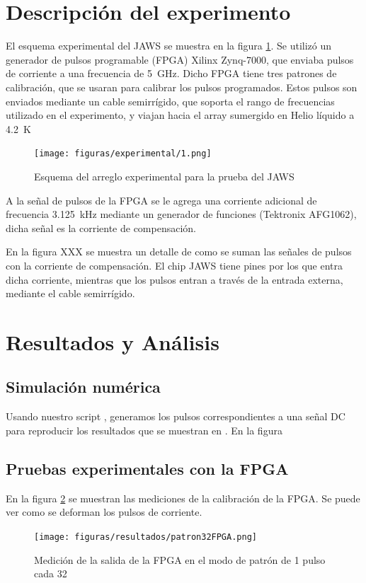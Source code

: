 \documentclass[twoside]{article}
\begin{document}
\begin{multicols}{2}
\section{Descripción del experimento}

El esquema experimental del JAWS se muestra en la figura \ref{fig:experimental_1}. Se utilizó un generador de pulsos programable (FPGA) Xilinx Zynq-7000, que enviaba pulsos de corriente a una frecuencia de \SI{5}{\giga\hertz}. Dicho FPGA tiene tres patrones de calibración, que se usaran para calibrar los pulsos programados. Estos pulsos son enviados mediante un cable semirrígido, que soporta el rango de frecuencias utilizado en el experimento, y viajan hacia el array sumergido en Helio líquido a \SI{4.2}{\kelvin}

\begin{figure}[H]
    \centering
    \texttt{[image: figuras/experimental/1.png]}
    \caption{Esquema del arreglo experimental para la prueba del JAWS}
    \label{fig:experimental_1}
\end{figure}

A la señal de pulsos de la FPGA se le agrega una corriente adicional de frecuencia \SI{3.125}{\kilo\hertz} mediante un generador de funciones (Tektronix AFG1062), dicha señal es la corriente de compensación.

En la figura XXX se muestra un detalle de como se suman las señales de pulsos con la corriente de compensación. El chip JAWS tiene pines por los que entra dicha corriente, mientras que los pulsos entran a través de la entrada externa, mediante el cable semirrígido.

\section{Resultados y Análisis}

    \subsection{Simulación numérica}

    Usando nuestro script \cite{script}, generamos los pulsos correspondientes a una señal DC para reproducir los resultados que se muestran en \cite{aziz1996}. En la figura 

    \subsection{Pruebas experimentales con la FPGA}

    En la figura \ref{fig:resultados_patron32FPGA} se muestran las mediciones de la calibración de la FPGA. Se puede ver como se deforman los pulsos de corriente.

    \begin{figure}[H]
        \centering
        \texttt{[image: figuras/resultados/patron32FPGA.png]}
        \caption{Medición de la salida de la FPGA en el modo de patrón de 1 pulso cada 32}
        \label{fig:resultados_patron32FPGA}
    \end{figure}



\end{multicols}





\nocite{*} %
\end{document}
